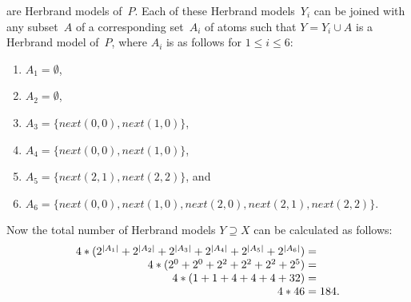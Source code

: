 \begin{Loesung}
{\begin{UList}
are Herbrand models of~$P$.
Each of these Herbrand models~$Y_i$ can be joined with any subset~$A$ of a corresponding set~$A_i$ of atoms
such that $Y=Y_i\cup A$ is a Herbrand model of~$P$, where $A_i$ is as follows for $1\leq i\leq 6$:
\begin{enumerate}
\item $A_1=\emptyset$,
\item $A_2=\emptyset$,
\item $A_3=\{\mathit{next}(0,0),\mathit{next}(1,0)\}$,
\item $A_4=\{\mathit{next}(0,0),\mathit{next}(1,0)\}$,
\item $A_5=\{\mathit{next}(2,1),\mathit{next}(2,2)\}$, and
\item $A_6=\{\mathit{next}(0,0),\mathit{next}(1,0),\mathit{next}(2,0),\mathit{next}(2,1),\mathit{next}(2,2)\}$.
\end{enumerate}
Now the total number of Herbrand models $Y\supseteq X$ can be calculated as follows:
\[
\begin{array}{r@{}c@{}l}
 4*(2^{|A_1|}+2^{|A_2|}+2^{|A_3|}+2^{|A_4|}+2^{|A_5|}+2^{|A_6|}) & {} = {} \\
 4*(2^0+2^0+2^2+2^2+2^2+2^5) & {} = {} \\
 4*(1+1+4+4+4+32) & {} = {} \\
 4*46 & {} = {} & 184
 \mbox{.}
\end{array}
\]
\end{UList}}
\end{Loesung}

